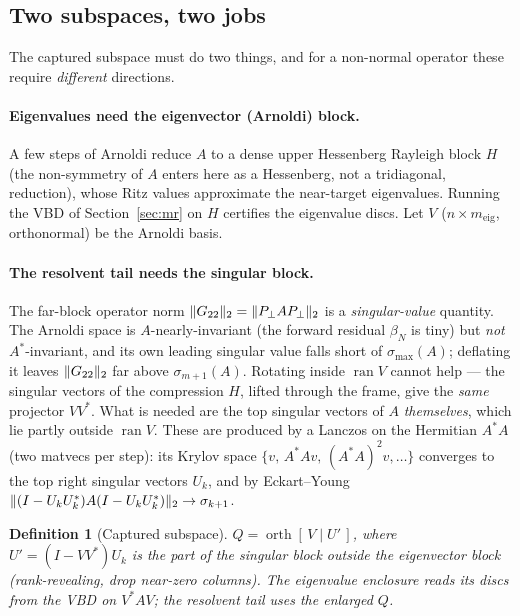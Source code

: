 \documentclass[11pt]{article}
\newtheorem{definition}[theorem]{Definition}
\newcommand{\sigmax}{\sigma_{\max}}
\DeclarePairedDelimiter{\norm}{\lVert}{\rVert}
\begin{document}
\subsection{Two subspaces, two jobs}\label{sec:twosub}

The captured subspace must do two things, and for a non-normal operator these require \emph{different}
directions.

\paragraph{Eigenvalues need the eigenvector (Arnoldi) block.} A few steps of Arnoldi reduce $A$ to a
dense upper Hessenberg Rayleigh block $H$ (the non-symmetry of $A$ enters here as a Hessenberg, not a
tridiagonal, reduction), whose Ritz values approximate the near-target eigenvalues. Running the VBD of
Section~\ref{sec:mr} on $H$ certifies the eigenvalue discs. Let $V$ ($n\times m_{\mathrm{eig}}$,
orthonormal) be the Arnoldi basis.

\paragraph{The resolvent tail needs the singular block.} The far-block operator norm
$\norm{G_{22}}_2=\norm{P_\perp A P_\perp}_2$ is a \emph{singular-value} quantity. The Arnoldi space is
$A$-nearly-invariant (the forward residual $\beta_N$ is tiny) but \emph{not} $A^*$-invariant, and its
own leading singular value falls short of $\sigmax(A)$; deflating it leaves $\norm{G_{22}}_2$ far above
$\sigma_{m+1}(A)$. Rotating inside $\operatorname{ran}V$ cannot help --- the singular vectors of the
compression $H$, lifted through the frame, give the \emph{same} projector $VV^*$. What is needed are
the top singular vectors of $A$ \emph{themselves}, which lie partly outside $\operatorname{ran}V$.
These are produced by a Lanczos on the Hermitian $A^*A$ (two matvecs per step): its Krylov space
$\{v,\,A^*Av,\,(A^*A)^2v,\dots\}$ converges to the top right singular vectors $U_k$, and by
Eckart--Young $\norm{(I-U_kU_k^*)A(I-U_kU_k^*)}_2\to\sigma_{k+1}$.

\begin{definition}[Captured subspace]\label{def:Q}
$Q=\operatorname{orth}[\,V\mid U'\,]$, where $U'=(I-VV^*)U_k$ is the part of the singular block outside
the eigenvector block (rank-revealing, drop near-zero columns). The eigenvalue enclosure reads its
discs from the VBD on $V^*AV$; the resolvent tail uses the enlarged $Q$.
\end{definition}
\end{document}
